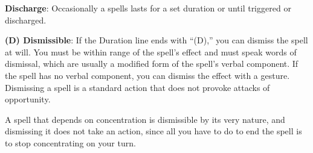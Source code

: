 \textbf{Discharge}: Occasionally a spells lasts for a set duration or until triggered or discharged.

\textbf{(D) Dismissible}: If the Duration line ends with  ``(D),'' you can dismiss the spell at will. You must be within range of the spell's effect and must speak words of dismissal, which are usually a modified form of the spell's verbal component. If the spell has no verbal component, you can dismiss the effect with a gesture. Dismissing a spell is a standard action that does not provoke attacks of opportunity.

A spell that depends on concentration is dismissible by its very nature, and dismissing it does not take an action, since all you have to do to end the spell is to stop concentrating on your turn.